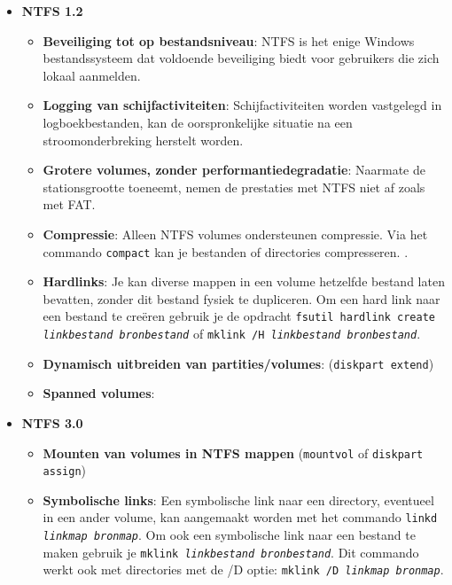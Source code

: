 \documentclass{report}
\begin{document}
\begin{enumerate}
		 {
			\begin{itemize}
				\item \textbf{NTFS 1.2}
					\begin{itemize}
						\item \textbf{Beveiliging tot op bestandsniveau}: NTFS is het enige Windows bestandssysteem dat voldoende beveiliging biedt voor gebruikers die zich lokaal aanmelden.
						\item \textbf{Logging van schijfactiviteiten}: Schijfactiviteiten worden vastgelegd in logboekbestanden, kan de oorspronkelijke situatie na een stroomonderbreking herstelt worden.
						\item \textbf{Grotere volumes, zonder performantiedegradatie}: Naarmate de stationsgrootte toeneemt, nemen de prestaties met NTFS niet af zoals met FAT.
						\item \textbf{Compressie}: Alleen NTFS volumes ondersteunen compressie. Via het commando \texttt{compact} kan je bestanden of directories compresseren. .
						\item \textbf{Hardlinks}: Je kan diverse mappen in een volume hetzelfde bestand laten bevatten, zonder dit bestand fysiek te dupliceren. Om een hard link naar een bestand te creëren gebruik je de opdracht \texttt{fsutil hardlink create \emph{linkbestand} \emph{bronbestand}} of \texttt{mklink /H \emph{linkbestand} \emph{bronbestand}}.
						\item \textbf{Dynamisch uitbreiden van partities/volumes}: (\texttt{diskpart extend})
						\item \textbf{Spanned volumes}: 
					\end{itemize}
				\item \textbf{NTFS 3.0}
					\begin{itemize}
						\item \textbf{Mounten van volumes in NTFS mappen} (\texttt{mountvol} of \texttt{diskpart assign})
						\item \textbf{Symbolische links}: Een symbolische link naar een directory, eventueel in een ander volume, kan aangemaakt worden met het commando \texttt{linkd \emph{linkmap} \emph{bronmap}}. Om ook een symbolische link naar een bestand te maken gebruik je \texttt{mklink \emph{linkbestand} \emph{bronbestand}}. Dit commando werkt ook met directories met de /D optie: \texttt{mklink /D \emph{linkmap} \emph{bronmap}}.

\end{itemize}
\end{itemize}}
\end{enumerate}
\end{document}
